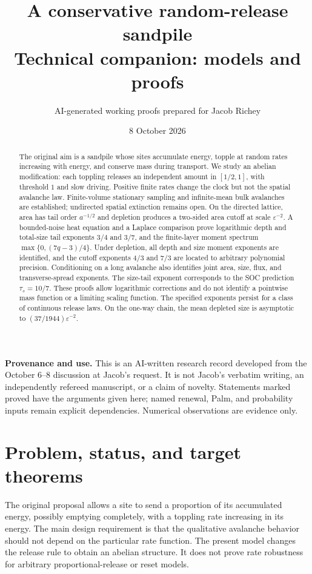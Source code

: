 \documentclass[11pt]{article}
\title{A conservative random-release sandpile\\\large Technical companion: models and proofs}
\author{AI-generated working proofs prepared for Jacob Richey}
\date{8 October 2026}
\numberwithin{equation}{section}
\theoremstyle{definition}
\begin{document}
\maketitle
\begin{abstract}
The original aim is a sandpile whose sites accumulate energy, topple at random rates increasing with energy, and conserve mass during transport. We study an abelian modification: each toppling releases an independent amount in $[1/2,1]$, with threshold $1$ and slow driving. Positive finite rates change the clock but not the spatial avalanche law. Finite-volume stationary sampling and infinite-mean bulk avalanches are established; undirected spatial extinction remains open. On the directed lattice, area has tail order $a^{-1/2}$ and depletion produces a two-sided area cutoff at scale $\varepsilon^{-2}$. A bounded-noise heat equation and a Laplace comparison prove logarithmic depth and total-size tail exponents $3/4$ and $3/7$, and the finite-layer moment spectrum $\max\{0,(7q-3)/4\}$. Under depletion, all depth and size moment exponents are identified, and the cutoff exponents $4/3$ and $7/3$ are located to arbitrary polynomial precision. Conditioning on a long avalanche also identifies joint area, size, flux, and transverse-spread exponents. The size-tail exponent corresponds to the SOC prediction $\tau_s=10/7$. These proofs allow logarithmic corrections and do not identify a pointwise mass function or a limiting scaling function. The specified exponents persist for a class of continuous release laws. On the one-way chain, the mean depleted size is asymptotic to $(37/1944)\varepsilon^{-2}$.
\end{abstract}
\noindent\textbf{Provenance and use.} This is an AI-written research record developed from the October 6--8 discussion at Jacob's request. It is not Jacob's verbatim writing, an independently refereed manuscript, or a claim of novelty. Statements marked proved have the arguments given here; named renewal, Palm, and probability inputs remain explicit dependencies. Numerical observations are evidence only. 

\section{Problem, status, and target theorems}\label{sec:frontier}

The original proposal allows a site to send a proportion of its accumulated energy, possibly emptying completely, with a toppling rate increasing in its energy. The main design requirement is that the qualitative avalanche behavior should not depend on the particular rate function. The present model changes the release rule to obtain an abelian structure. It does not prove rate robustness for arbitrary proportional-release or reset models.
\end{document}
